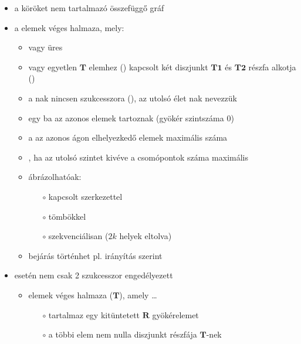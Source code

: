 \documentclass[main.tex]{subfiles}
\begin{document}
  \begin{itemize}
    \item a  köröket nem tartalmazó összefüggő gráf
    
    \item a  elemek véges halmaza, mely:
    \begin{itemize}
      \item vagy üres
      
      \item vagy egyetlen $\mathbf{T}$ elemhez ()
      kapcsolt két diszjunkt $\mathbf{T1}$ és $\mathbf{T2}$
      részfa alkotja ()

      \item a nak nincsen szukcesszora
      (), az utolsó élet nak nevezzük
      
      \item egy ba az azonos
       elemek tartoznak
      (gyökér szintszáma 0)
      
      \item a  az azonos ágon elhelyezkedő
      elemek maximális száma
      
      \item {}, ha az utolsó szintet kivéve
      a csomópontok száma maximális

      \item ábrázolhatóak:
      \begin{itemize}
        \item[$\circ$] kapcsolt szerkezettel
        \item[$\circ$] tömbökkel
        \item[$\circ$] szekvenciálisan ($2k$ helyek eltolva)
      \end{itemize}

      \item bejárás történhet pl. irányítás szerint
    \end{itemize}

    \item {} esetén
    nem csak 2 szukcesszor engedélyezett
    \begin{itemize}
      \item elemek véges halmaza ($\mathbf{T}$), amely \dots
      \begin{itemize}
        \item[$\circ$] tartalmaz egy kitüntetett
        $\mathbf{R}$ gyökérelemet
        \item[$\circ$] a többi elem nem nulla diszjunkt
        részfája $\mathbf{T}$-nek
      \end{itemize}
    \end{itemize}
    

\end{itemize}
\end{document}
